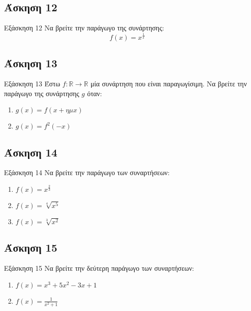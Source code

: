 \documentclass[greek]{beamer}
\begin{document}
\subsection{Άσκηση 12}
\begin{frame}[label=Άσκηση12]{Εξάσκηση 12}
  Να βρείτε την παράγωγο της συνάρτησης:
  $$f(x)=x^{\frac{1}{x}}$$

\end{frame}

\subsection{Άσκηση 13}
\begin{frame}[label=Άσκηση13]{Εξάσκηση 13}
  Έστω $f:\mathbb{R}\to\mathbb{R}$ μία συνάρτηση που είναι παραγωγίσιμη. Να βρείτε την παράγωγο της συνάρτησης $g$ όταν:
  \begin{enumerate}
    \item<1-> $g(x)=f(x+ημx)$
    \item<2-> $g(x)=f^2(-x)$
  \end{enumerate}

\end{frame}

\subsection{Άσκηση 14}
\begin{frame}[label=Άσκηση14]{Εξάσκηση 14}
  Να βρείτε την παράγωγο των συναρτήσεων:
  \begin{enumerate}
    \item<1-> $f(x)=x^{\frac{2}{3}}$
    \item<2-> $f(x)=\sqrt[4]{x^5}$
    \item<3-> $f(x)=\sqrt[3]{x^2}$
  \end{enumerate}

\end{frame}

\subsection{Άσκηση 15}
\begin{frame}[label=Άσκηση15]{Εξάσκηση 15}
  Να βρείτε την δεύτερη παράγωγο των συναρτήσεων:
  \begin{enumerate}
    \item<1-> $f(x)=x^3+5x^2-3x+1$
    \item<2-> $f(x)=\frac{1}{x^2+1}$
  \end{enumerate}

\end{frame}
\end{document}
